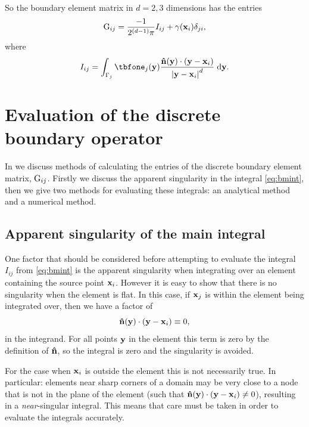 \newcommand{\bminta}{I}
\newcommand{\bmint}{\bminta_{ij}}

So the boundary element matrix in $d=2,3$ dimensions has the entries
\begin{equation}
  \label{eq:19}
  \bm_{\ibasis\ibasisb} =\frac{-1}{2^{(d-1)} \pi} \bmint
    + \gamma(\xv_\ibasis)\delta_{\ibasisb\ibasis},
\end{equation}
where
\begin{equation}
  \bmint = \int_{\boundd_\ibasisb} \tbfone_{\ibasisb}(\yv) \frac{\nv(\yv) \cdot (\yv - \xv_\ibasis)}{\abs{\yv - \xv_\ibasis} ^d} \d \yv.
\label{eq:bmint}
\end{equation}


\section{Evaluation of the discrete boundary operator}
\label{sec:calc-integr-i_bm}

In  we discuss methods of calculating the entries of the discrete boundary element matrix, ${\mathbf{\mathrm{G}}}_{{i}{j}}$.
Firstly we discuss the apparent singularity in the integral \cref{eq:bmint}, then we give two methods for evaluating these integrals: an analytical method and a numerical method.

\subsection{Apparent singularity of the main integral}
\label{sec:bem-singularity}

One factor that should be considered before attempting to evaluate the integral $\bmint$ from \cref{eq:bmint} is the apparent singularity when integrating over an element containing the source point $\boldsymbol{\mathrm{x}}_{i}$.
However it is easy to show that there is no singularity when the element is flat.
In this case, if $\boldsymbol{\mathrm{x}}_{j}$ is within the element being integrated over, then we have a factor of
\begin{equation}
  \label{eq:7}
  \boldsymbol{\mathrm{\hat{n}}}(\boldsymbol{\mathrm{y}}) \cdot (\boldsymbol{\mathrm{y}} - \boldsymbol{\mathrm{x}}_i) \equiv 0,
\end{equation}
in the integrand.
For all points $\boldsymbol{\mathrm{y}}$ in the element this term is zero by the definition of $\boldsymbol{\mathrm{\hat{n}}}$, so the integral is zero and the singularity is avoided.

For the case when $\boldsymbol{\mathrm{x}}_i$ is outside the element this is not necessarily true.
In particular: elements near sharp corners of a domain may be very close to a node that is not in the plane of the element (\ie such that $\boldsymbol{\mathrm{\hat{n}}}(\boldsymbol{\mathrm{y}}) \cdot (\boldsymbol{\mathrm{y}} - \boldsymbol{\mathrm{x}}_i) \neq 0$), resulting in a \emph{near}-singular integral.
This means that care must be taken in order to evaluate the integrals accurately.



